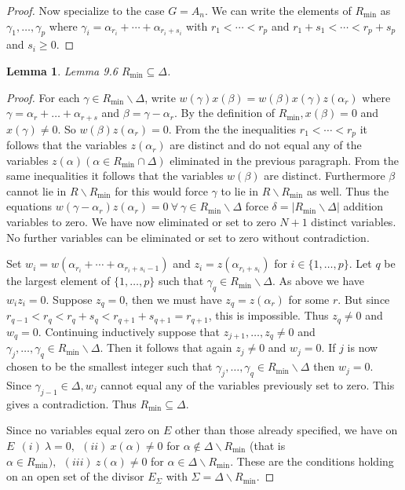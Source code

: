 \documentclass{memo-l}
\newtheorem{lemma}[theorem]{Lemma}
\theoremstyle{definition}
\theoremstyle{remark}
\numberwithin{section}{chapter}
\numberwithin{equation}{chapter}
\begin{document}
\begin{proof}
   Now specialize to the case $G = A_{n}$.
 We can write the elements of $R_{\min}$ as ${\gamma}_1,
\ldots ,{\gamma}_p$  where ${\gamma}_i
= {\alpha}_{r_{i}} +\cdots + {\alpha}_{r_{i}+s_{i}}$  with $r_{1} < \cdots <
r_{p}$ and $r_{1}+s_{1}< \cdots < r_{p}+s_{p}$ and $s_{i} \ge 0$.
\end{proof}

\begin{lemma}{Lemma  9.6}   $R_{\min} {\subseteq} {\Delta}$.
\end{lemma}

\begin{proof}    For each ${\gamma} \in R_{\min}\backslash {\Delta}$,
write $w({\gamma})x({\beta})=w({\beta})x({\gamma})z({\alpha}_{r})$ where
${\gamma} = {\alpha}_{r} + \ldots + {\alpha}_{r+s}$ and ${\beta} =
{\gamma}-{\alpha}_{r}$.
 By the definition of $R_{\min}, x({\beta}) = 0$ and $x({\gamma}) \ne 0$.
 So $w({\beta})z({\alpha}_{r}) = 0$.
 From the the inequalities $r_{1} < \cdots < r_{p}$ it follows that the
variables $z({\alpha}_{r})$ are distinct and do not equal any of the variables
$z({\alpha}) ({\alpha} \in R_{\min} {\cap} {\Delta})$ eliminated in the
previous paragraph.
 From the same inequalities it follows that the variables $w({\beta})$ are
distinct.
 Furthermore ${\beta}$ cannot lie in $R\backslash R_{\min}$ for this would
force ${\gamma}$ to lie in $R\backslash R_{\min}$ as well.
 Thus the equations $w({\gamma}-{\alpha}_{r})z({\alpha}_{r}) =
0 {\ \forall\ } {\gamma} \in R_{\min}\backslash {\Delta}$ force
${\delta} = \vert R_{\min}\backslash {\Delta}\vert$  addition variables to zero.
 We have now eliminated or set to zero $N+1$ distinct variables.
 No further variables can be eliminated or set to zero without contradiction.

   Set $w_{i} = w({\alpha}_{r_{i}} + \cdots +{\alpha}_{r_{i}+s_{i}-1})$ and
$z_{i} = z({\alpha}_{r_{i}+s_{i}})$ for $i \in \{1,\ldots ,p\}. $
Let $q$ be the largest element of $\{1,\ldots ,p\}$ such that
${\gamma}_{q} \in R_{\min}\backslash {\Delta}$.
 As above we have $w_{i}z_{i} = 0$.
 Suppose $z_{q} = 0$, then we must have $z_{q} = z({\alpha}_{r})$ for some $r$.
 But since $r_{q-1} < r_{q} < r_{q}+s_{q} < r_{q+1}+s_{q+1} = r_{q+1}$, this
is impossible.  Thus $z_{q} \ne 0$ and $w_{q}=0$.
 Continuing inductively suppose that $z_{j+1},\ldots ,z_{q} \ne  0$ and
${\gamma}_{j},\ldots ,{\gamma}_{q} \in R_{\min}\backslash {\Delta}$.
 Then it follows that again $z_{j} \ne 0$ and $w_{j} = 0$.
 If $j$ is now chosen to be the smallest integer such that
${\gamma}_{j},\ldots ,{\gamma}_{q} \in R_{\min}\backslash {\Delta}$ then
$w_{j}=0 .$  Since ${\gamma}_{j-1} \in {\Delta}, w_{j}$ cannot equal any
of the variables previously set to zero.
 This gives a contradiction.  Thus $R_{\min} {\subseteq} {\Delta}$.

   Since no variables equal zero on $E$ other than those already specified,
we have on $E \ \ (i) \ {\lambda}=0, \ \ (ii) \ x({\alpha})\ne 0$ for ${\alpha} \notin
{\Delta}\backslash R_{\min}$ (that is ${\alpha} \in R_{\min}),
\ \ (iii) \ z({\alpha})\ne 0$ for ${\alpha} \in {\Delta}\backslash R_{\min}$.
 These are the conditions holding on an open set of the divisor $E_{{\Sigma}}$
with ${\Sigma} = {\Delta}\backslash R_{\min}$.
\end{proof}
\end{document}
